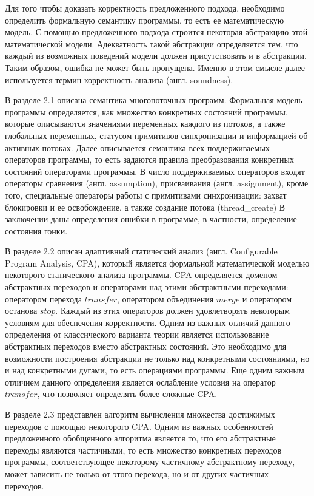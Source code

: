Для того чтобы доказать корректность предложенного подхода, необходимо определить формальную семантику программы, то есть ее математическую модель.
С помощью предложенного подхода строится некоторая абстракцию этой математической модели. 
Адекватность такой абстракции определяется тем, что каждый из возможных поведений модели должен присутствовать и в абстракции.
Таким образом, ошибка не может быть пропущена.
Именно в этом смысле далее используется термин корректность анализа (англ. soundness).

В разделе 2.1 описана семантика многопоточных программ. 
Формальная модель программы определяется, как множество конкретных состояний программы, которые описываются значениями переменных каждого из потоков, а также глобальных переменных, статусом примитивов синхронизации и информацией об активных потоках.
Далее описывается семантика всех поддерживаемых операторов программы, то есть задаются правила преобразования конкретных состояний операторами программы.
В число поддерживаемых операторов входят операторы сравнения (англ. assumption), присваивания (англ. assignment),
кроме того, специальные операторы работы с примитивами синхронизации: захват блокировки и ее освобождение, а также создание потока (thread\_create)
В заключении даны определения ошибки в программе, в частности, определение состояния гонки.

В разделе 2.2 описан адаптивный статический анализ (англ. Configurable Program Analysis, CPA), который является формальной математической моделью некоторого статического анализа программы.
CPA определяется доменом абстрактных переходов и операторами над этими абстрактными переходами: оператором перехода $transfer$, оператором объединения $merge$ и оператором останова $stop$.
Каждый из этих операторов должен удовлетворять некоторым условиям для обеспечения корректности.
Одним из важных отличий данного определения от классического варианта теории является использование абстрактных переходов вместо абстрактных состояний.
Это необходимо для возможности построения абстракции не только над конкретными состояниями, но и над конкретными дугами, то есть операциями программы.
Еще одним важным отличием данного определения является ослабление условия на оператор $transfer$, что позволяет определять более сложные CPA.

В разделе 2.3 представлен алгоритм вычисления множества достижимых переходов с помощью некоторого CPA.
Одним из важных особенностей предложенного обобщенного алгоритма является то, что его абстрактные переходы являются частичными, то есть множество конкретных переходов программы, соответствующее некоторому частичному абстрактному переходу, может зависить не только от этого перехода, но и от других частичных переходов. 

